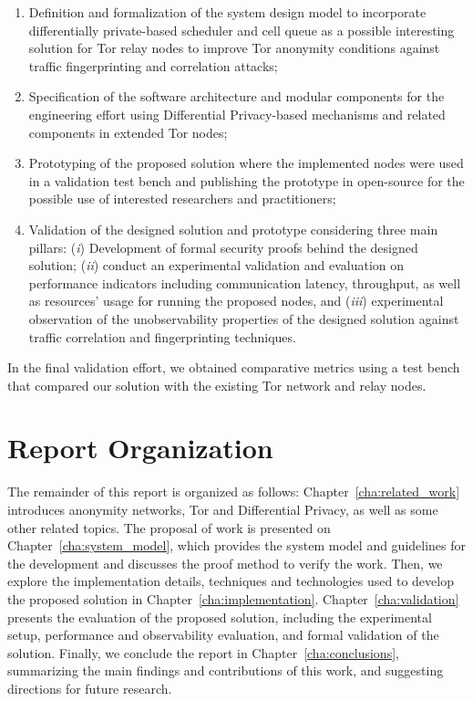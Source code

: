 \begin{enumerate}
    \item Definition and formalization of the system design model to incorporate differentially private-based scheduler and cell queue as a possible interesting solution for Tor relay nodes to improve Tor anonymity conditions against traffic fingerprinting and correlation attacks;

    \item Specification of the software architecture and modular components for the engineering effort using Differential Privacy-based mechanisms and related components in extended Tor nodes;
   
    \item Prototyping of the proposed solution where the implemented nodes were used in a validation test bench and publishing the prototype in open-source for the possible use of interested researchers and practitioners;
   
    \item Validation of the designed solution and prototype considering three main pillars: (\emph{i}) Development of formal security proofs behind the designed solution; (\emph{ii}) conduct an experimental validation and evaluation on performance indicators including communication latency, throughput, as well as resources' usage for running the proposed nodes, and (\emph{iii}) experimental observation of the unobservability properties of the designed solution against traffic correlation and fingerprinting techniques. 
   
\end{enumerate}

In the final validation effort, we obtained comparative metrics using a test bench that compared our solution with the existing Tor network and relay nodes.


\section{Report Organization}\label{sec:report_organization}
The remainder of this report is organized as follows: Chapter~\ref{cha:related_work} introduces anonymity networks, Tor and Differential Privacy, as well as some other related topics. The proposal of work is presented on Chapter~\ref{cha:system_model}, which provides the system model and guidelines for the development and discusses the proof method to verify the work. Then, we explore the implementation details, techniques and technologies used to develop the proposed solution in Chapter~\ref{cha:implementation}. Chapter~\ref{cha:validation} presents the evaluation of the proposed solution, including the experimental setup, performance and observability evaluation, and formal validation of the solution. Finally, we conclude the report in Chapter~\ref{cha:conclusions}, summarizing the main findings and contributions of this work, and suggesting directions for future research.